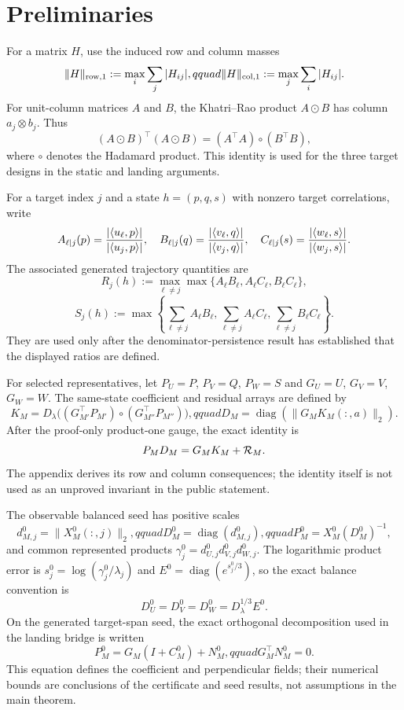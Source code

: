 \section{Preliminaries}\label{sec:preliminaries}

For a matrix $H$, use the induced row and column masses
\[
 \|H\|_{\rm row,1}:=\max_i\sum_j|H_{ij}|,qquad
 \|H\|_{\rm col,1}:=\max_j\sum_i|H_{ij}|.
\]
For unit-column matrices $A$ and $B$, the Khatri--Rao product $A\odot B$
has column $a_j\otimes b_j$. Thus
\[
 (A\odot B)^\top(A\odot B)=(A^\top A)\circ(B^\top B),
\]
where $\circ$ denotes the Hadamard product. This identity is used for the
three target designs in the static and landing arguments.

For a target index $j$ and a state $h=(p,q,s)$ with nonzero target
correlations, write
\[
 A_{\ell\mid j}(p)={|\langle u_\ell,p\rangle|\over
 |\langle u_j,p\rangle|},\quad
 B_{\ell\mid j}(q)={|\langle v_\ell,q\rangle|\over
 |\langle v_j,q\rangle|},\quad
 C_{\ell\mid j}(s)={|\langle w_\ell,s\rangle|\over
 |\langle w_j,s\rangle|}.
\]
The associated generated trajectory quantities are
\[
 R_j(h):=\max_{\ell\ne j}\max\{A_\ell B_\ell,A_\ell C_\ell,B_\ell C_\ell\},
\]
\[
 S_j(h):=\max\left\{\sum_{\ell\ne j}A_\ell B_\ell,
 \sum_{\ell\ne j}A_\ell C_\ell,
 \sum_{\ell\ne j}B_\ell C_\ell\right\}.
\]
They are used only after the denominator-persistence result has established
that the displayed ratios are defined.

For selected representatives, let $P_U=P$, $P_V=Q$, $P_W=S$ and
$G_U=U$, $G_V=V$, $G_W=W$. The same-state coefficient and residual arrays
are defined by
\[
 K_M=D_\lambda\bigl((G_{M'}^\top P_{M'})\circ
 (G_{M''}^\top P_{M''})\bigr),qquad
 D_M=\operatorname{diag}(\|G_MK_M(:,a)\|_2).
\]
After the proof-only product-one gauge, the exact identity is
\[
 P_MD_M=G_MK_M+{\cal R}_M.
\]
The appendix derives its row and column consequences; the identity itself is
not used as an unproved invariant in the public statement.

The observable balanced seed has positive scales
\[
 d_{M,j}^0=\|X_M^0(:,j)\|_2,qquad
 D_M^0=\operatorname{diag}(d_{M,j}^0),qquad
 P_M^0=X_M^0(D_M^0)^{-1},
\]
and common represented products
$\gamma_j^0=d_{U,j}^0d_{V,j}^0d_{W,j}^0$.  The logarithmic product error is
$s_j^0=\log(\gamma_j^0/\lambda_j)$ and
$E^0=\operatorname{diag}(e^{s_j^0/3})$, so the exact balance convention is
\[
 D_U^0=D_V^0=D_W^0=D_\lambda^{1/3}E^0.
\]
On the generated target-span seed, the exact orthogonal decomposition used
in the landing bridge is written
\[
 P_M^0=G_M(I+C_M^0)+N_M^0,qquad G_M^\top N_M^0=0.
\]
This equation defines the coefficient and perpendicular fields; their
numerical bounds are conclusions of the certificate and seed results, not
assumptions in the main theorem.

